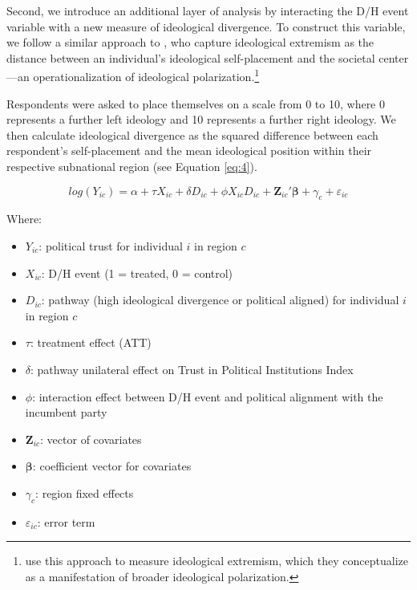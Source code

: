 \documentclass{article}
\begin{document}
Second, we introduce an additional layer of analysis by interacting the D/H event variable with a new measure of ideological divergence. To construct this variable, we follow a similar approach to \textcite{torcal_ideological_2022}, who capture ideological extremism as the distance between an individual’s ideological self-placement and the societal center—an operationalization of ideological polarization.\footnote{\textcite{torcal_ideological_2022} use this approach to measure ideological extremism, which they conceptualize as a manifestation of broader ideological polarization.}

Respondents were asked to place themselves on a scale from 0 to 10, where 0 represents a further left ideology and 10 represents a further right ideology. We then calculate ideological divergence as the squared difference between each respondent's self-placement and the mean ideological position within their respective subnational region (see Equation \ref{eq:4}).

\begin{equation}
  \label{eq:4}
  log(Y_{ic}) = \alpha + \tau X_{ic} + \delta D_{ic} + \phi X_{ic}D_{ic} + \mathbf{Z}_{ic}'\mathbf{\beta} + \gamma_c + \varepsilon_{ic}
  \end{equation}
  
  Where:
  \begin{itemize}
    \item \( Y_{ic} \): political trust for individual \( i \) in region \( c \)
    \item \( X_{ic} \): D/H event (1 = treated, 0 = control)
    \item \( D_{ic} \): pathway (high ideological divergence or political aligned) for individual \( i \) in region \( c \)
    \item \( \tau \): treatment effect (ATT)
    \item \( \delta \): pathway unilateral effect on Trust in Political Institutions Index
    \item \( \phi \): interaction effect between D/H event and political alignment with the incumbent party
    \item \( \mathbf{Z}_{ic} \): vector of covariates
    \item \( \mathbf{\beta} \): coefficient vector for covariates
    \item \( \gamma_c \): region fixed effects
    \item \( \varepsilon_{ic} \): error term
  \end{itemize}
\end{document}
